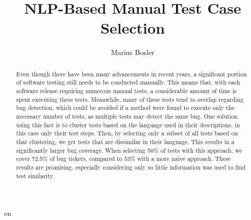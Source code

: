 \documentclass[runningheads]{llncs}
\begin{document}
\title{NLP-Based Manual Test Case Selection}
\author{Marius Bosler}
%
\maketitle %
%
%
\begin{abstract}
Even though there have been many advancements in recent years, a significant portion of software testing still needs to be conducted manually. This means that, with each software release requiring numerous manual tests, a considerable amount of time is spent executing these tests. Meanwhile, many of these tests tend to overlap regarding bug detection, which could be avoided if a method were found to execute only the necessary number of tests, as multiple tests may detect the same bug. One solution using this fact is to cluster tests based on the language used in their descriptions, in this case only their test steps. Then, by selecting only a subset of all tests based on that clustering, we get tests that are dissimilar in their language. This results in a significantly larger bug coverage. When selecting 50\% of tests with this approach, we cover 72.5\% of bug tickets, compared to 53\% with a more naive approach. These results are promising, especially considering only so little information was used to find test similarity. 


\end{abstract}
%
%







%
%

en%
\end{document}
